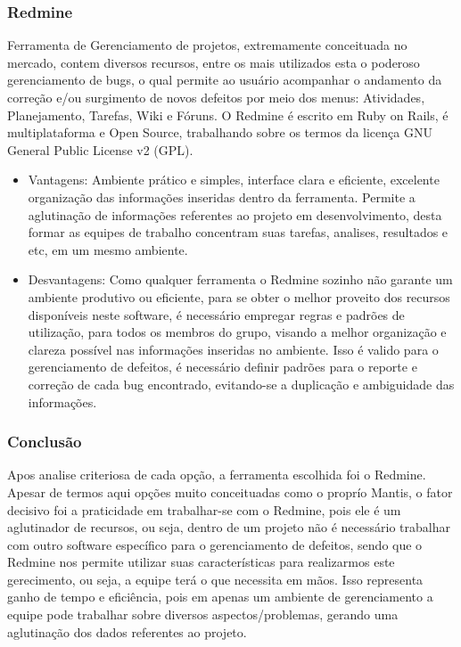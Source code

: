 \documentclass[12pt,a4paper]{article}
\begin{document}
		\subsubsection{Redmine}
		
			 Ferramenta de Gerenciamento de projetos, extremamente conceituada no mercado, contem diversos recursos, 
			 entre os mais utilizados esta o poderoso gerenciamento de bugs, o qual permite ao usuário acompanhar o 
			 andamento da correção e/ou surgimento de novos defeitos por meio dos menus: Atividades, Planejamento, Tarefas, Wiki e Fóruns.
			 O Redmine é escrito em Ruby on Rails, é multiplataforma e Open Source, trabalhando sobre os termos da licença GNU
			 General Public License v2 (GPL).
			 
			 \begin{itemize}
			 	\item Vantagens:
			 		Ambiente prático e simples, interface clara e eficiente, excelente organização das informações inseridas dentro da ferramenta. Permite a aglutinação de informações referentes ao projeto em desenvolvimento, desta formar as equipes de trabalho  concentram suas tarefas, analises, resultados e etc, em um mesmo ambiente. 
			 	\item Desvantagens:
			 		Como qualquer ferramenta o Redmine sozinho não garante um ambiente produtivo ou eficiente, para se obter o melhor proveito dos recursos disponíveis neste software, é necessário empregar regras e padrões de utilização, para todos os membros do grupo, visando a melhor organização e clareza possível nas informações inseridas no ambiente. Isso é valido para o gerenciamento de defeitos, é necessário definir padrões para o reporte e correção de cada bug encontrado, evitando-se a duplicação e ambiguidade das informações. 
			 \end{itemize}
			 
		
		\subsubsection{Conclusão}
		
			Apos analise criteriosa de cada opção, a ferramenta escolhida foi o Redmine. 
			Apesar de termos aqui opções muito conceituadas como o proprío Mantis, o fator decisivo foi a praticidade em trabalhar-se com o Redmine, 
			pois ele é um aglutinador de recursos, ou seja, dentro de um projeto não é necessário trabalhar com outro software específico para o gerenciamento de defeitos, 
			sendo que o Redmine nos permite utilizar suas características para realizarmos este gerecimento, ou seja, a equipe terá o que necessita em mãos. 
			Isso representa ganho de tempo e eficiência, pois em apenas um ambiente de gerenciamento a equipe pode trabalhar sobre diversos aspectos/problemas, 
			gerando uma aglutinação dos dados referentes ao projeto.
		
\end{document}
